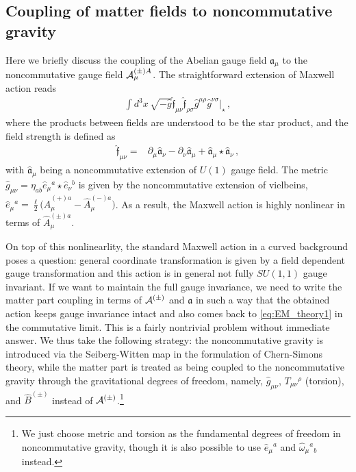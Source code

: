\documentclass[11pt]{article}
\numberwithin{equation}{section}
\begin{document}
\subsection{Coupling of matter fields to noncommutative gravity}
\label{sec:coupl-matt-fields}

Here we briefly discuss the coupling of the Abelian gauge field $\mathfrak{a}_\mu$
to the noncommutative gauge field ${\cal A}_\mu^{(\pm)A}$.
The straightforward extension of Maxwell action reads
\begin{align}
  \int d^3x \, \sqrt{-\hat{g}} \hat{\mathfrak{f}}_{\mu\nu} \hat{\mathfrak{f}}_{\rho\sigma}
\hat{g}^{\mu\rho} \hat{g}^{\nu\sigma} \big|_{\star} \,,
\end{align}
where the products between fields are understood to be the star product,
and the field strength is defined as
\begin{align}
  \hat{\mathfrak{f}}_{\mu\nu} =& 
\partial_\mu \hat{\mathfrak{a}}_\nu - \partial_\nu \hat{\mathfrak{a}}_\mu
+\hat{\mathfrak{a}}_\mu \star \hat{\mathfrak{a}}_\nu \,,
\end{align}
with $\hat{\mathfrak{a}}_\mu$ being a noncommutative extension of $U(1)$ gauge field.
The metric $\hat{g}_{\mu\nu}= \eta_{ab} \hat{e}_\mu{}^a \star \hat{e}_\nu{}^b$ is
given by the noncommutative extension of vielbeins,
 $\hat{e}_\mu{}^a=\frac{\ell}{2}\big( \hat{A}_\mu^{(+)a} - \hat{A}_\mu^{(-)a} \big)$.
As a result, the Maxwell action is highly nonlinear in terms of $\hat{A}_\mu^{(\pm)a}$.

On top of this nonlinearlity, the standard Maxwell action in a curved background
poses a question: general coordinate transformation is given by a field dependent
gauge transformation and this action is in general not fully $SU(1,1)$ gauge invariant.
If we want to maintain the full gauge invariance, we need to write the matter part coupling
in terms of ${\cal A}^{(\pm)}$ and $\mathfrak{a}$ in such a way that 
the obtained action keeps gauge invariance intact and also
comes back 
to \eqref{eq:EM_theory1} in the commutative limit.
This is a fairly nontrivial problem without immediate answer.
We thus take the following strategy:
the noncommutative gravity is introduced via the Seiberg-Witten map in the formulation of Chern-Simons theory,
while the matter part is treated as being coupled to the noncommutative gravity through
the gravitational degrees of freedom, namely, 
$\hat{g}_{\mu\nu}$, $T_{\mu\nu}{}^\rho$ (torsion), and $\hat{B}^{(\pm)}$ instead of
${\cal A}^{(\pm)}$.\footnote{%
We just choose metric and torsion as the fundamental degrees 
of freedom in noncommutative gravity, though
it is also possible to use $\hat{e}_\mu{}^a$ and $\hat{\omega}_\mu{}^a{}_b$ instead.}
\end{document}
